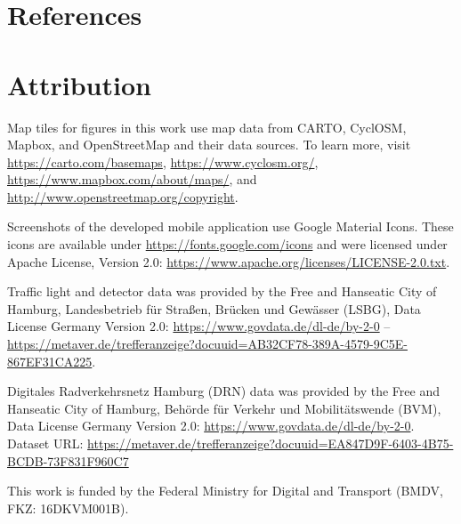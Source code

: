 \documentclass[
  ngerman,english, %
  BCOR=0mm,cdgeometry=no, %
  numbers=noenddot, %
  cd=fullcolor,
  headings=heavy,
  chapterpage=true,
  cdfont=off, %
  egregdoesnotlikesansseriftitles,
]{tudscrmanual}
\begin{document}
\section*{References}
\printbibliography[heading=none,nottype=student,notkeyword={ownpaper,notrelated},notkeyword={ownpaper,related}]
\pagebreak

\newpage
{}

\section*{Attribution}\label{attribution}

Map tiles for figures in this work use map data from CARTO, CyclOSM, Mapbox, and OpenStreetMap and their data sources. To learn more, visit \url{https://carto.com/basemaps}, \url{https://www.cyclosm.org/}, \url{https://www.mapbox.com/about/maps/}, and \url{http://www.openstreetmap.org/copyright}.

Screenshots of the developed mobile application use Google Material Icons. These icons are available under \url{https://fonts.google.com/icons} and were licensed under Apache License, Version 2.0: \url{https://www.apache.org/licenses/LICENSE-2.0.txt}.

Traffic light and detector data was provided by the Free and Hanseatic City of Hamburg, Landesbetrieb für Straßen, Brücken und Gewässer (LSBG), Data License Germany Version 2.0: \url{https://www.govdata.de/dl-de/by-2-0} -- \url{https://metaver.de/trefferanzeige?docuuid=AB32CF78-389A-4579-9C5E-867EF31CA225}.

Digitales Radverkehrsnetz Hamburg (DRN) data was provided by the Free and Hanseatic City of Hamburg, Behörde für Verkehr und Mobilitätswende (BVM), Data License Germany Version 2.0: \url{https://www.govdata.de/dl-de/by-2-0}. Dataset URL: \url{https://metaver.de/trefferanzeige?docuuid=EA847D9F-6403-4B75-BCDB-73F831F960C7}

This work is funded by the Federal Ministry for Digital and Transport (BMDV, FKZ: 16DKVM001B).
\end{document}
